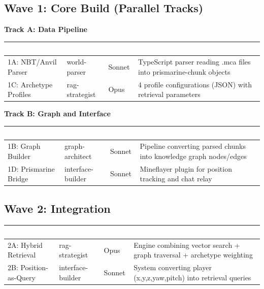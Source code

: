 \documentclass[11pt,letterpaper]{article}
\newcommand{\tableheader}[1]{\textbf{\sffamily\textcolor{white}{#1}}}
\begin{document}
\subsection{Wave 1: Core Build (Parallel Tracks)}

\textbf{Track A: Data Pipeline}

\begin{center}
\begin{tabularx}{\textwidth}{L{2.5cm}L{2cm}C{1.5cm}X}
\toprule
{}
\tableheader{Task} & \tableheader{Agent} & \tableheader{Model} & \tableheader{Output} \\
\midrule
1A: NBT/Anvil Parser & world-parser & Sonnet & TypeScript parser reading .mca files into prismarine-chunk objects \\
1C: Archetype Profiles & rag-strategist & Opus & 4 profile configurations (JSON) with retrieval parameters \\
\bottomrule
\end{tabularx}
\end{center}

\textbf{Track B: Graph and Interface}

\begin{center}
\begin{tabularx}{\textwidth}{L{2.5cm}L{2cm}C{1.5cm}X}
\toprule
{}
\tableheader{Task} & \tableheader{Agent} & \tableheader{Model} & \tableheader{Output} \\
\midrule
1B: Graph Builder & graph-architect & Sonnet & Pipeline converting parsed chunks into knowledge graph nodes/edges \\
1D: Prismarine Bridge & interface-builder & Sonnet & Mineflayer plugin for position tracking and chat relay \\
\bottomrule
\end{tabularx}
\end{center}

\subsection{Wave 2: Integration}

\begin{center}
\begin{tabularx}{\textwidth}{L{2.5cm}L{2cm}C{1.5cm}X}
\toprule
{}
\tableheader{Task} & \tableheader{Agent} & \tableheader{Model} & \tableheader{Output} \\
\midrule
2A: Hybrid Retrieval & rag-strategist & Opus & Engine combining vector search + graph traversal + archetype weighting \\
2B: Position-as-Query & interface-builder & Sonnet & System converting player (x,y,z,yaw,pitch) into retrieval queries \\
\bottomrule
\end{tabularx}
\end{center}
\end{document}
